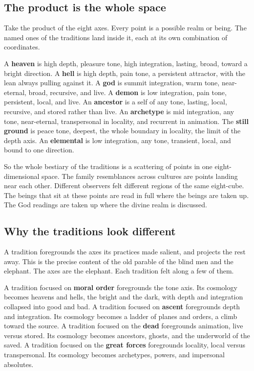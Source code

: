 \subsection{The product is the whole space}

Take the product of the eight axes. Every point is a possible realm or
being. The named ones of the traditions land inside it, each at its own
combination of coordinates.

A \textbf{heaven} is high depth, pleasure tone, high integration, lasting,
broad, toward a bright direction. A \textbf{hell} is high depth, pain tone,
a persistent attractor, with the lean always pulling against it. A
\textbf{god} is summit integration, warm tone, near-eternal, broad,
recursive, and live. A \textbf{demon} is low integration, pain tone,
persistent, local, and live. An \textbf{ancestor} is a self of any tone,
lasting, local, recursive, and stored rather than live. An
\textbf{archetype} is mid integration, any tone, near-eternal,
transpersonal in locality, and recurrent in animation. The \textbf{still
ground} is peace tone, deepest, the whole boundary in locality, the limit
of the depth axis. An \textbf{elemental} is low integration, any tone,
transient, local, and bound to one direction.

So the whole bestiary of the traditions is a scattering of points in one
eight-dimensional space. The family resemblances across cultures are points
landing near each other. Different observers felt different regions of the
same eight-cube. The beings that sit at these points are read in full where
the beings are taken up. The God readings are taken up where the divine
realm is discussed.

\subsection{Why the traditions look different}

A tradition foregrounds the axes its practices made salient, and projects
the rest away. This is the precise content of the old parable of the blind
men and the elephant. The axes are the elephant. Each tradition felt along
a few of them.

A tradition focused on \textbf{moral order} foregrounds the tone axis. Its
cosmology becomes heavens and hells, the bright and the dark, with depth
and integration collapsed into good and bad. A tradition focused on
\textbf{ascent} foregrounds depth and integration. Its cosmology becomes a
ladder of planes and orders, a climb toward the source. A tradition focused
on the \textbf{dead} foregrounds animation, live versus stored. Its
cosmology becomes ancestors, ghosts, and the underworld of the saved. A
tradition focused on the \textbf{great forces} foregrounds locality, local
versus transpersonal. Its cosmology becomes archetypes, powers, and
impersonal absolutes.

